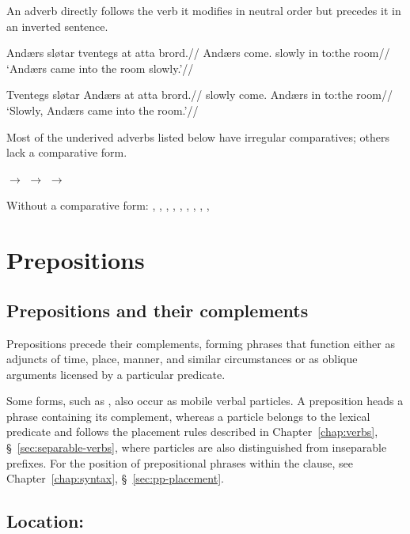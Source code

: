 An adverb directly follows the verb it modifies in neutral order but precedes it in an inverted sentence.

\pex
\begingl
\gla Andærs sløtar tventegs at atta brord.//
\glb Andærs come.\Pst{} slowly in to:the room//
\glft `Andærs came into the room slowly.'//
\endgl
\xe

\pex
\begingl
\gla Tventegs sløtar Andærs at atta brord.//
\glb slowly come.\Pst{} Andærs in to:the room//
\glft `Slowly, Andærs came into the room.'//
\endgl
\xe

Most of the underived adverbs listed below have irregular comparatives; others lack a comparative form.

\pex
\a {} $\rightarrow$ 
\a {} $\rightarrow$ 
\a {} $\rightarrow$ 
\xe

\pex
Without a comparative form: , , , , , , , , , 
\xe

\section{Prepositions}
\label{sec:prepositions}

\subsection{Prepositions and their complements}

Prepositions precede their complements, forming phrases that function either as adjuncts of time, place, manner, and similar circumstances or as oblique arguments licensed by a particular predicate.

Some forms, such as , also occur as mobile verbal particles. A preposition heads a phrase containing its complement, whereas a particle belongs to the lexical predicate and follows the placement rules described in Chapter~\ref{chap:verbs}, \S~\ref{sec:separable-verbs}, where particles are also distinguished from inseparable prefixes. For the position of prepositional phrases within the clause, see Chapter~\ref{chap:syntax}, \S~\ref{sec:pp-placement}.

\subsection{Location: }
\label{sec:spatial-prepositions}

